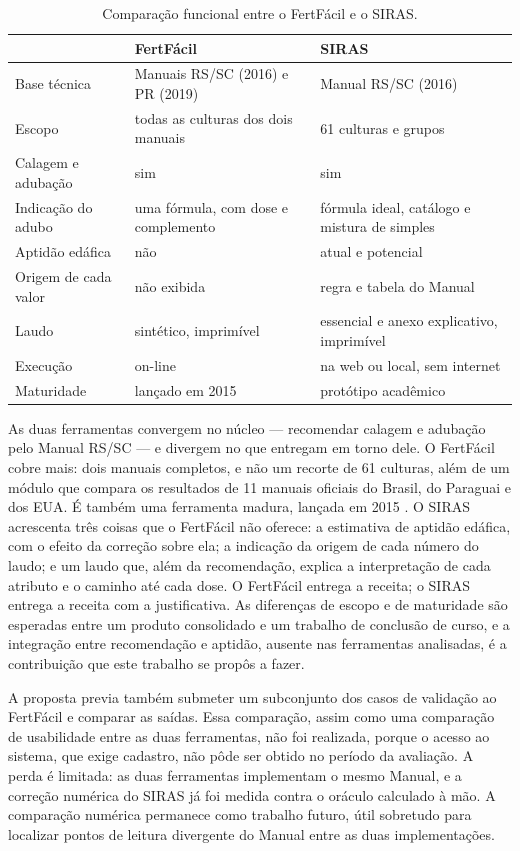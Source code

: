 \begin{table}[htb]
\centering
\caption{Comparação funcional entre o FertFácil e o SIRAS.}
\label{tab:fertfacil}
\footnotesize
\begin{tabularx}{\columnwidth}{@{}lLL@{}}
\toprule
 & \textbf{FertFácil} & \textbf{SIRAS} \\
\midrule
Base técnica & Manuais RS/SC (2016) e PR (2019) & Manual RS/SC (2016) \\
Escopo & todas as culturas dos dois manuais & 61 culturas e grupos \\
Calagem e adubação & sim & sim \\
Indicação do adubo & uma fórmula, com dose e complemento & fórmula ideal, catálogo e mistura de simples \\
Aptidão edáfica & não & atual e potencial \\
Origem de cada valor & não exibida & regra e tabela do Manual \\
Laudo & sintético, imprimível & essencial e anexo explicativo, imprimível \\
Execução & on-line & na web ou local, sem internet \\
Maturidade & lançado em 2015 & protótipo acadêmico \\
\bottomrule
\end{tabularx}
\end{table}

As duas ferramentas convergem no núcleo --- recomendar calagem e adubação pelo Manual RS/SC --- e
divergem no que entregam em torno dele. O FertFácil cobre mais: dois manuais completos, e não um
recorte de 61 culturas, além de um módulo que compara os resultados de 11 manuais oficiais do
Brasil, do Paraguai e dos EUA. É também uma
ferramenta madura, lançada em 2015 \citep{MaisSoja2026}. O SIRAS acrescenta três coisas que
o FertFácil não oferece: a estimativa de aptidão edáfica, com o efeito da correção sobre ela; a
indicação da origem de cada número do laudo; e um laudo que, além da recomendação, explica a
interpretação de cada atributo e o caminho até cada dose. O FertFácil entrega a receita; o SIRAS
entrega a receita com a justificativa. As diferenças de escopo e de maturidade são esperadas entre
um produto consolidado e um trabalho de conclusão de curso, e a integração entre recomendação e
aptidão, ausente nas ferramentas analisadas, é a contribuição que este trabalho se propôs a fazer.

A proposta previa também submeter um subconjunto dos casos de validação ao FertFácil e comparar as
saídas. Essa comparação, assim como uma comparação de usabilidade entre as duas ferramentas, não
foi realizada, porque o acesso ao sistema, que exige cadastro, não pôde ser obtido no período da
avaliação. A perda é limitada: as duas ferramentas implementam o mesmo Manual,
e a correção numérica do SIRAS já foi medida contra o oráculo calculado à mão. A comparação
numérica permanece como trabalho futuro, útil sobretudo para localizar pontos de leitura
divergente do Manual entre as duas implementações.


